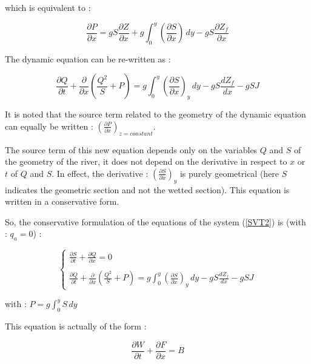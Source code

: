 which is equivalent to :

\begin{equation}
 \frac{\partial P}{\partial x} = g S \frac{\partial Z}{\partial x} + g \int_{0}^y \left ( \frac{\partial S}{\partial x}\right ) \, dy - g S \frac{\partial Z_f}{\partial x}
\end{equation}

The dynamic equation can be re-written as :

\begin{equation}
 \frac{\partial Q}{\partial t} + \frac{\partial}{\partial x} \left ( \frac{Q^2}{S} + P \right ) = g \int_{0}^y \left ( \frac{\partial S}{\partial x} \right )_y \, dy - g S \frac{dZ_f}{dx} - g S J
\end{equation}

It is noted that the source term related to the geometry of the dynamic equation can equally be written : $\left( \frac{\partial P}{\partial x} \right )_{z = constant}$.

The source term of this new equation depends only on the variables $Q$ and $S$ of the geometry of the river, it does not depend on the derivative in respect to $x$ or $t$ of $Q$ and $S$. In effect, the derivative : $\left ( \frac{\partial S}{\partial x} \right )_y$ is purely geometrical (here $S$ indicates the geometric section and not the wetted section). This equation is written in a conservative form.

So, the conservative formulation of the equations of the system (\ref{SVT2}) is (with : $q_a = 0$) :

\begin{equation}
 \label{SVT3}
 \left \lbrace
  \begin{array}{l}
    \frac{\partial S}{\partial t} + \frac{\partial Q}{\partial x} = 0 \\
    \\
    \frac{\partial Q}{\partial t} + \frac{\partial}{\partial x} \left ( \frac{Q^2}{S} + P \right ) = g \int_{0}^y \left ( \frac{\partial S}{\partial x} \right )_y \, dy - g S \frac{dZ_f}{dx} - g S J
  \end{array}
 \right.
\end{equation}

with : $P = g \int_{0}^{y} S \, dy$

This equation is actually of the form :

\begin{equation}
 \frac{\partial W}{\partial t} + \frac{\partial F}{\partial x} = B
\end{equation}

